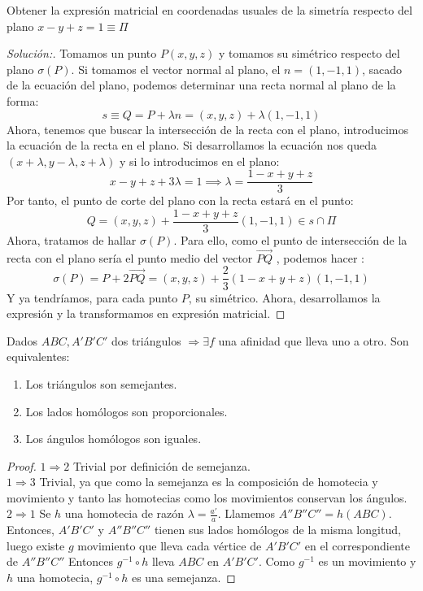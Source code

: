 \begin{ejemplo}
  Obtener la expresión matricial en coordenadas usuales de la simetría respecto del plano $x-y+z = 1\equiv \Pi$
\end{ejemplo}
\begin{proof}[Solución:]
  Tomamos un punto $P(x,y,z)$ y tomamos su simétrico respecto del plano $\sigma(P)$. Si tomamos el vector normal al plano, el $n=(1,-1,1)$, sacado de la ecuación del plano, podemos determinar una recta normal al plano de la forma:
  \[
    s\equiv Q = P + \lambda n = (x,y,z)+\lambda(1,-1,1)
  \]
  Ahora, tenemos que buscar la intersección de la recta con el plano, introducimos la ecuación de la recta en el plano. Si desarrollamos la ecuación nos queda $(x+\lambda,y-\lambda,z+\lambda)$ y si lo introducimos en el plano:
  \[
    x-y+z+3\lambda = 1 \implies \lambda = \frac{1-x+y+z}{3}
  \]
  Por tanto, el punto de corte del plano con la recta estará en el punto:
  \[
    Q = (x,y,z)+\frac{1-x+y+z}{3}(1,-1,1) \in s\cap \Pi
  \]
  Ahora, tratamos de hallar $\sigma(P)$. Para ello, como el punto de intersección de la recta con el plano sería el punto medio del vector $\vec{PQ}$ , podemos hacer :
  \[
    \sigma(P) = P + 2 \vec{PQ} = (x,y,z) + \dfrac{2}{3}(1-x+y+z)(1,-1,1)
  \]
  Y ya tendríamos, para cada punto $P$, su simétrico. Ahora, desarrollamos la expresión y la transformamos en expresión matricial.
\end{proof}

\begin{nth}
  Dados $ABC, A'B'C'$ dos triángulos $\Rightarrow \exists f$ una afinidad que lleva uno a otro. Son equivalentes:
  \begin{enumerate}
  \item Los triángulos son semejantes.
  \item Los lados homólogos son proporcionales.
  \item Los ángulos homólogos son iguales.
  \end{enumerate}
\end{nth}

\begin{proof} \hfill

  $\boxed{1 \Rightarrow 2}$ Trivial por definición de semejanza.\\
  $\boxed{1 \Rightarrow 3}$ Trivial, ya que como la semejanza es la composición de homotecia y movimiento y tanto las homotecias como los movimientos conservan los ángulos.\\
  $\boxed{2 \Rightarrow 1}$ Se $h$ una homotecia de razón $\lambda = \frac{a'}{a}$. Llamemos $A''B''C'' = h(ABC)$. Entonces, $A'B'C'$ y $A''B''C''$ tienen sus lados homólogos de la misma longitud, luego existe $g$ movimiento que lleva cada vértice de $A'B'C'$ en el correspondiente de $A''B''C''$ Entonces $g^{-1} \circ h$ lleva $ABC$ en $	A'B'C'$. Como $g^{-1}$ es un movimiento y $h$ una homotecia, $g^{-1} \circ h$ es una semejanza.
\end{proof}


